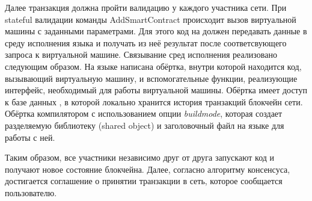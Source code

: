 Далее транзакция должна пройти валидацию у каждого участника сети.
При stateful валидации команды Add\-Smart\-Con\-tract происходит вызов виртуальной машины  с заданными параметрами.
Для этого код на  должен передавать данные в среду исполнения языка  и получать из неё результат после соответсвующего запроса к виртуальной машине.
Связывание сред исполнения реализовано следующим образом.
На языке  написана обёртка, внутри которой находится код, вызывающий виртуальную машину, и вспомогательные функции, реализующие интерфейс, необходимый для работы виртуальной машины.
Обёртка имеет доступ к базе данных , в которой локально хранится история транзакций блокчейн сети.
Обёртка  компилятором  с использованием опции \emph{buildmode}, которая создает разделяемую библиотеку (shared object) и заголовочный файл на языке  для работы с ней.

Таким образом, все участники независимо друг от друга запускают код и получают новое состояние блокчейна.
Далее, согласно алгоритму консенсуса, достигается соглашение о принятии транзакции в сеть, которое сообщается пользователю.
